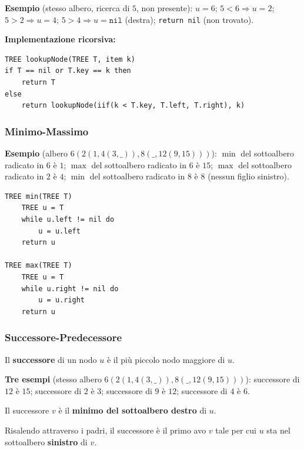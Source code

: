 \documentclass[12pt, a4paper]{article}
\begin{document}
\textbf{Esempio} (stesso albero, ricerca di $5$, non presente): $u=6$; $5<6\Rightarrow u=2$; $5>2\Rightarrow u=4$; $5>4\Rightarrow u=\texttt{nil}$ (destra); \texttt{return nil} (non trovato).

\textbf{Implementazione ricorsiva:}
\begin{verbatim}
TREE lookupNode(TREE T, item k)
if T == nil or T.key == k then
    return T
else
    return lookupNode(iif(k < T.key, T.left, T.right), k)
\end{verbatim}

\subsubsection{Minimo-Massimo}

\textbf{Esempio} (albero $6(2(1,4(3,\_)),8(\_,12(9,15)))$): $\min$ del sottoalbero radicato in $6$ è $1$; $\max$ del sottoalbero radicato in $6$ è $15$; $\max$ del sottoalbero radicato in $2$ è $4$; $\min$ del sottoalbero radicato in $8$ è $8$ (nessun figlio sinistro).

\begin{verbatim}
TREE min(TREE T)
    TREE u = T
    while u.left != nil do
        u = u.left
    return u

TREE max(TREE T)
    TREE u = T
    while u.right != nil do
        u = u.right
    return u
\end{verbatim}

\subsubsection{Successore-Predecessore}

\begin{tcolorbox}[colback=lightergray!10, colframe=tocsec, title=\textbf{Definizione: Successore}]
\label{def:successore-abr}
Il \textbf{successore} di un nodo $u$ è il più piccolo nodo maggiore di $u$.
\end{tcolorbox}

\textbf{Tre esempi} (stesso albero $6(2(1,4(3,\_)),8(\_,12(9,15)))$): successore di $12$ è $15$; successore di $2$ è $3$; successore di $9$ è $12$; successore di $4$ è $6$.

\begin{tcolorbox}[colback=lightergray!5, colframe=tocsubsec, title=\textbf{Caso 1: $u$ ha Figlio Destro}]
Il successore $v$ è il \textbf{minimo del sottoalbero destro} di $u$.
\end{tcolorbox}

\begin{tcolorbox}[colback=lightergray!5, colframe=tocsubsec, title=\textbf{Caso 2: $u$ non ha Figlio Destro}]
Risalendo attraverso i padri, il successore è il primo avo $v$ tale per cui $u$ sta nel sottoalbero \textbf{sinistro} di $v$.
\end{tcolorbox}
\end{document}
